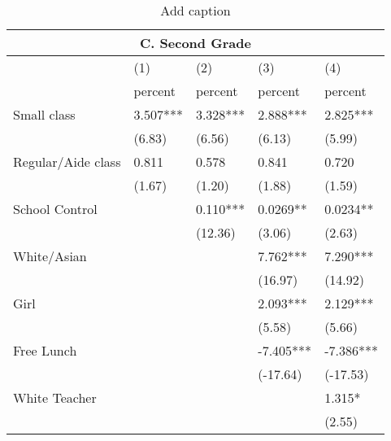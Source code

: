\documentclass{article}
\begin{document}
\begin{table}[htbp]
  \centering
  \caption{Add caption}
    \begin{tabular}{lrllrr}
    \toprule
    \multicolumn{6}{c}{C. Second Grade} \\
    \midrule
          &       & (1)   & (2)   & \multicolumn{1}{l}{(3)} & \multicolumn{1}{l}{(4)} \\
          &       & percent & percent & \multicolumn{1}{l}{percent} & \multicolumn{1}{l}{percent} \\
    \multicolumn{2}{l}{Small class} & 3.507*** & 3.328*** & \multicolumn{1}{l}{2.888***} & \multicolumn{1}{l}{2.825***} \\
          &       & (6.83) & (6.56) & \multicolumn{1}{l}{(6.13)} & \multicolumn{1}{l}{(5.99)} \\
    \multicolumn{2}{l}{Regular/Aide class} & 0.811 & 0.578 & \multicolumn{1}{l}{0.841} & \multicolumn{1}{l}{0.720} \\
          &       & (1.67) & (1.20) & \multicolumn{1}{l}{(1.88)} & \multicolumn{1}{l}{(1.59)} \\
    \multicolumn{2}{l}{School Control} &       & 0.110*** & \multicolumn{1}{l}{0.0269**} & \multicolumn{1}{l}{0.0234**} \\
          &       &       & (12.36) & \multicolumn{1}{l}{(3.06)} & \multicolumn{1}{l}{(2.63)} \\
    \multicolumn{2}{l}{White/Asian} &       &       & \multicolumn{1}{l}{7.762***} & \multicolumn{1}{l}{7.290***} \\
          &       &       &       & \multicolumn{1}{l}{(16.97)} & \multicolumn{1}{l}{(14.92)} \\
    \multicolumn{2}{l}{Girl} &       &       & \multicolumn{1}{l}{2.093***} & \multicolumn{1}{l}{2.129***} \\
          &       &       &       & \multicolumn{1}{l}{(5.58)} & \multicolumn{1}{l}{(5.66)} \\
    \multicolumn{2}{l}{Free Lunch} &       &       & \multicolumn{1}{l}{-7.405***} & \multicolumn{1}{l}{-7.386***} \\
          &       &       &       & \multicolumn{1}{l}{(-17.64)} & \multicolumn{1}{l}{(-17.53)} \\
    \multicolumn{2}{l}{White Teacher} &       &       & \multicolumn{1}{l}{} & \multicolumn{1}{l}{1.315*} \\
          &       &       &       & \multicolumn{1}{l}{} & \multicolumn{1}{l}{(2.55)} \\

\end{tabular}
\end{table}
\end{document}
